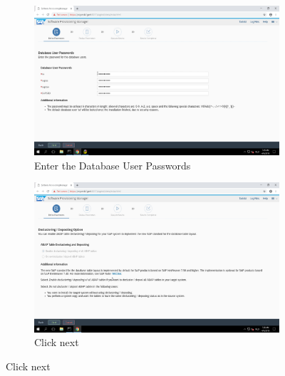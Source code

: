 \begin{figure}[!htb]\ContinuedFloat
    \begin{subfigure}{0.5\textwidth}
        \captionsetup{width=0.8\linewidth}
        \includegraphics[width=0.9\linewidth]{img/Methodologie/SAP18.png}
        \centering
        \caption{Enter the Database User Passwords}
    \end{subfigure}
    \begin{subfigure}{0.5\textwidth}
    \captionsetup{width=0.8\linewidth}
    \includegraphics[width=0.9\linewidth]{img/Methodologie/SAP16.png}
    \centering
    \caption{Click next}
    \end{subfigure}
\end{figure}
